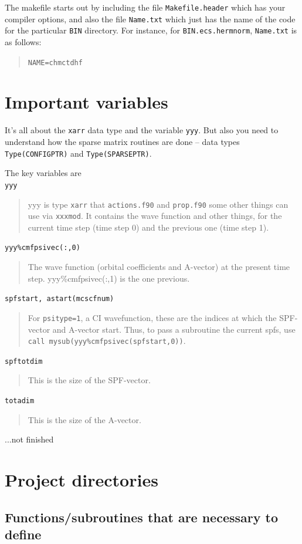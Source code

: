 \documentclass[10pt,leqno, oneside]{book}
\begin{document}
The makefile starts out by including the file \verb#Makefile.header# 
which has your compiler options, and also the file \verb#Name.txt# which just has the name of the code for the particular \verb#BIN# directory.  For instance, for \verb#BIN.ecs.hermnorm#,
\verb#Name.txt# is as follows:
\begin{quote}
\verb#NAME=chmctdhf#
\end{quote}


\section{Important variables}


It's all about the \verb#xarr# data type and the variable \verb#yyy#.  But also you need to understand how the sparse matrix routines are done --
data types \verb#Type(CONFIGPTR)# and \verb#Type(SPARSEPTR)#.


The key variables are \\

\verb#yyy# 
\begin{quote}
 yyy is type \verb#xarr# that \verb#actions.f90# and \verb#prop.f90# some other things can use via \verb#xxxmod#.  It contains the
 wave function and other things, for the current time step (time step 0) and the previous one (time step 1).
\end{quote}

\verb#yyy%cmfpsivec(:,0)#
\begin{quote}
The wave function (orbital coefficients and A-vector) at the present time step.  yyy\%cmfpsivec(:,1) is the one previous.
\end{quote}

\verb#spfstart, astart(mcscfnum)# 
\begin{quote}
For \verb#psitype=1#, a CI wavefunction, these are the indices at which the 
SPF-vector and A-vector start.  Thus, to pass a subroutine the current spfs, use 
 \verb#call mysub(yyy%cmfpsivec(spfstart,0))#.
\end{quote}
 
\verb#spftotdim# 
\begin{quote}
 This is the size of the SPF-vector. 
\end{quote}
 
\verb#totadim# 
\begin{quote}
 This is the size of the A-vector. 
\end{quote}
 
 ...not finished
 
 \section{Project directories}
 \subsection{Functions/subroutines that are necessary to define}
 
\end{document}
